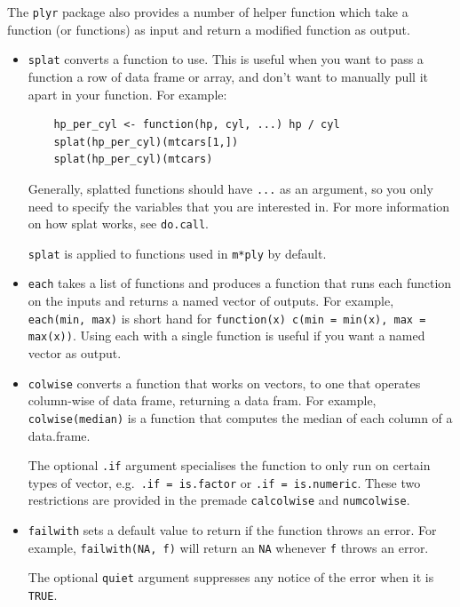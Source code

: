 \documentclass[letterpage]{scrartcl}
\begin{document}
The {\tt plyr} package also provides a number of helper function which take a function (or functions) as input and return a modified function as output.  

\begin{itemize}
  \item {\tt splat} converts a function to use.  This is useful when you want to pass a function a row of data frame or array, and don't want to manually pull it apart in your function.  For example:
  
  \begin{verbatim}
    hp_per_cyl <- function(hp, cyl, ...) hp / cyl
    splat(hp_per_cyl)(mtcars[1,])
    splat(hp_per_cyl)(mtcars)
  \end{verbatim} 
  
  Generally, splatted functions should have {\tt ...} as an argument, so you only need to specify the variables that you are interested in.  For more information on how splat works, see {\tt do.call}.  
  
  {\tt splat} is applied to functions used in {\tt m*ply} by default.

  \item {\tt each} takes a list of functions and produces a function that runs  each function on the inputs and returns a named vector of outputs.   For example, {\tt each(min, max)} is short hand for {\tt function(x) c(min = min(x), max = max(x))}.  Using each with a single function is useful if you want a named vector as output.

  \item {\tt colwise} converts a function that works on vectors, to one that operates column-wise of data frame, returning a data fram.  For example, {\tt colwise(median)} is a function that computes the median of each column of a data.frame.  
  
  The optional {\tt .if} argument specialises the function to only run on certain types of vector, e.g.\ {\tt .if = is.factor} or {\tt .if = is.numeric}.  These two restrictions are provided in the premade {\tt calcolwise} and {\tt numcolwise}.  
  
  \item {\tt failwith} sets a default value to return if the function throws an error.  For example, {\tt failwith(NA, f)} will return an {\tt NA} whenever {\tt f} throws an error.  
  
  The optional {\tt quiet} argument suppresses any notice of the error when it is {\tt TRUE}.

\end{itemize}
\end{document}
